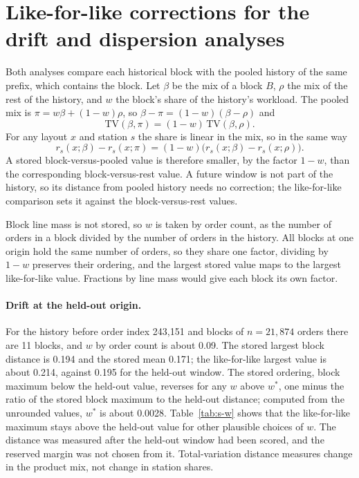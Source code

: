 \documentclass[11pt]{article}
\begin{document}
\section{Like-for-like corrections for the drift and dispersion analyses}\label{sec:s-likeforlike}
Both analyses compare each historical block with the pooled history of the same prefix, which contains the block. Let $\beta$ be the mix of a block $B$, $\rho$ the mix of the rest of the history, and $w$ the block's share of the history's workload. The pooled mix is $\pi=w\beta+(1-w)\rho$, so $\beta-\pi=(1-w)(\beta-\rho)$ and
\begin{equation}
\mathrm{TV}(\beta,\pi)=(1-w)\,\mathrm{TV}(\beta,\rho). \label{eq:s-tv}
\end{equation}
For any layout $x$ and station $s$ the share is linear in the mix, so in the same way
\begin{equation}
r_s(x;\beta)-r_s(x;\pi)=(1-w)\bigl(r_s(x;\beta)-r_s(x;\rho)\bigr). \label{eq:s-disp}
\end{equation}
A stored block-versus-pooled value is therefore smaller, by the factor $1-w$, than the corresponding block-versus-rest value. A future window is not part of the history, so its distance from pooled history needs no correction; the like-for-like comparison sets it against the block-versus-rest values.

Block line mass is not stored, so $w$ is taken by order count, as the number of orders in a block divided by the number of orders in the history. All blocks at one origin hold the same number of orders, so they share one factor, dividing by $1-w$ preserves their ordering, and the largest stored value maps to the largest like-for-like value. Fractions by line mass would give each block its own factor.

\paragraph{Drift at the held-out origin.} For the history before order index 243,151 and blocks of $n=21{,}874$ orders there are 11 blocks, and $w$ by order count is about 0.09. The stored largest block distance is 0.194 and the stored mean 0.171; the like-for-like largest value is about 0.214, against 0.195 for the held-out window. The stored ordering, block maximum below the held-out value, reverses for any $w$ above $w^*$, one minus the ratio of the stored block maximum to the held-out distance; computed from the unrounded values, $w^*$ is about 0.0028. Table~\ref{tab:s-w} shows that the like-for-like maximum stays above the held-out value for other plausible choices of $w$. The distance was measured after the held-out window had been scored, and the reserved margin was not chosen from it. Total-variation distance measures change in the product mix, not change in station shares.
\end{document}
